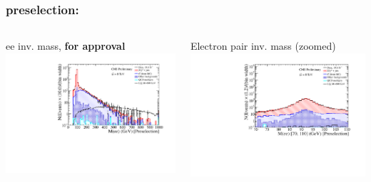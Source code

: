 \documentclass[bigger]{beamer}
\providecommand{\alert}[1]{\textbf{#1}}
\begin{document}
\begin{frame}
\frametitle{\eejj preselection: \mee}
\label{sec-2-1-2}
\begin{columns}
\begin{column}{0.6\textwidth}
\label{sec-2-1-2-1}

\centering
ee inv. mass, \alert{for approval}
\includegraphics[width=\textwidth]{fig/ee/preselection_noRatio/Mee_PAS_eejj.pdf}
\end{column}
\begin{column}{0.6\textwidth}
\label{sec-2-1-2-2}

\centering
Electron pair inv. mass (zoomed)
\includegraphics[width=\textwidth]{fig/ee/preselection_noRatio/Mee_70_110_Preselection_eejj.pdf}
\end{column}
\end{columns}
\end{frame}
\end{document}
